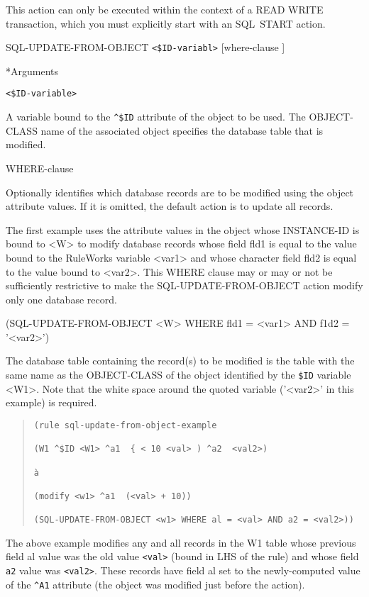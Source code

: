 {{This action can only be executed within the context of a READ
WRITE transaction, which you must explicitly start with an
SQL~START action.

\Format

SQL-UPDATE-FROM-OBJECT \verb|<$ID-variabl>| [where-clause ]

*Arguments

\verb|<$ID-variable>|

A variable bound to the \verb|^$ID| attribute of the object to be
used. The OBJECT-CLASS name of the associated object specifies the database
table that is modified.

WHERE-clause

Optionally identifies which database records are to be
modified using the object attribute values. If it is omitted,
the default action is to update all records.

\Example

The first example uses the attribute values in the object
whose INSTANCE-ID is bound to <W> to modify database records
whose field fld1 is equal to the value bound to the RuleWorks
variable <var1> and whose character field fld2 is equal to
the value bound to <var2>. This WHERE clause may or may or
not be sufficiently restrictive to make the
SQL-UPDATE-FROM-OBJECT action modify only one database
record.



(SQL-UPDATE-FROM-OBJECT <W> WHERE fld1 = <var1> AND f1d2 =
'<var2>')



The database table containing the record(s) to be modified is
the table with the same name as the OBJECT-CLASS of the
object identified by the \verb|$ID| variable <W1>. Note that the
white space around the quoted variable ('<var2>' in this
example) is required.
\begin{quote}
\begin{verbatim}
(rule sql-update-from-object-example

(W1 ^$ID <W1> ^a1  { < 10 <val> ) ^a2  <val2>)

à

(modify <w1> ^a1  (<val> + 10))

(SQL-UPDATE-FROM-OBJECT <w1> WHERE al = <val> AND a2 = <val2>))
\end{verbatim}
\end{quote}

The above example modifies any and all records in the W1 table whose
previous field al value was the old value \verb|<val>| (bound in LHS
of the rule) and whose field \verb|a2| value was \verb|<val2>|. These
records have field al set to the newly-computed value of the
\verb|^A1| attribute (the object was modified just before the
 action).

}}

